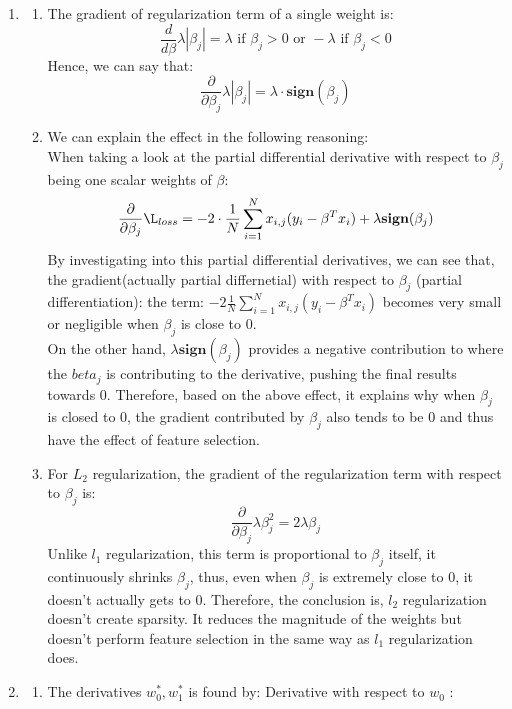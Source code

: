 \documentclass[12pt]{article}
\begin{document}
\begin{enumerate}
\item
\begin{enumerate}
\item The gradient of regularization term of a single weight is:\\
\[
\frac{d}{d\beta} \lambda|\beta_j| = \lambda \text{ if } \beta_j > 0 \text{ or } -\lambda \text{ if } \beta_j < 0
\]
Hence, we can say that:
\[
\frac{\partial}{\partial \beta_j} \lambda|\beta_j| = \lambda \cdot \textbf{sign}(\beta_j)
\]
\item We can explain the effect in the following reasoning:\\
When taking a look at the partial differential derivative with respect to $\beta_j$ being one scalar weights of $\beta$:
\[
\frac{\partial}{\partial \beta_j}\L_{loss} = -2 \cdot \frac{1}{N} \sum_{i = 1}^{N} x_{i,j}(y_i - \beta^T x_i) + \lambda \textbf{sign}(\beta_j)
\]
By investigating into this partial differential derivatives, we can see that, the gradient(actually partial differnetial) with respect to \(\beta_j\) (partial differentiation):
the term: \(-2 \frac{1}{N} \sum_{i = 1}^{N} x_{i,j} (y_i - \beta^{T} x_i)\) becomes very small or negligible when $\beta_j$ is close to \(0\).  \\
On the other hand, $\lambda \textbf{sign}(\beta_j)$ provides a negative contribution to where the $beta_j$ is contributing to the derivative, pushing the final results towards \(0\).
Therefore, based on the above effect, it explains why when \(\beta_j\)  is closed to \(0\), the gradient contributed by \(\beta_j\) also tends to be \(0\) and thus have the effect of feature selection.

\item For \(L_2\) regularization, the gradient of the regularization term with respect to \(\beta_j\) is:
\[
\frac{\partial}{\partial \beta_j} \lambda \beta_{j}^{2} = 2 \lambda \beta_{j}
\]
Unlike \(l_1\) regularization, this term is proportional to \(\beta_j\) itself, it continuously shrinks \(\beta_j\), thus, even when \(\beta_j\) is extremely close to \(0\), it doesn't actually gets to \(0\). Therefore, the conclusion is, \(l_2\) regularization doesn't create sparsity. It reduces the magnitude of the weights but doesn't perform feature selection in the same way as \(l_1\) regularization does.
\end{enumerate}

\item
  \begin{enumerate}
  \item The derivatives $w_{0}^{*}, w_{1}^{*}$ is found by:
  Derivative with respect to $w_0$ :


\end{enumerate}
\end{enumerate}
\end{document}
